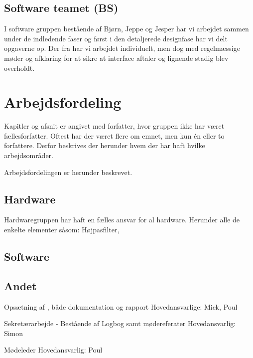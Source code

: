 \subsection{Software teamet (BS)}
I software gruppen bestående af Bjørn, Jeppe og Jesper har vi arbejdet sammen under de indledende faser og først i den detaljerede designfase har vi delt opgaverne op.
Der fra har vi arbejdet individuelt, men dog med regelmæssige møder og afklaring for at sikre at interface aftaler og lignende stadig blev overholdt.


\section{Arbejdsfordeling}
 
Kapitler og afsnit er angivet med forfatter, hvor gruppen ikke har været fællesforfatter. Oftest har der været flere om emnet, men kun én eller to forfattere. Derfor beskrives der herunder hvem der har haft hvilke arbejdsområder.  

Arbejdsfordelingen er herunder beskrevet. 

\subsection{Hardware}
Hardwaregruppen har haft en fælles ansvar for al hardware. Herunder alle de enkelte elementer såsom: Højpasfilter,  


\subsection{Software}

\subsection{Andet}

Opsætning af \Latex, både dokumentation og rapport
Hovedansvarlige: Mick, Poul 

Sekretærarbejde - Bestående af Logbog samt mødereferater
Hovedansvarlig: Simon

Mødeleder
Hovedansvarlig: Poul





